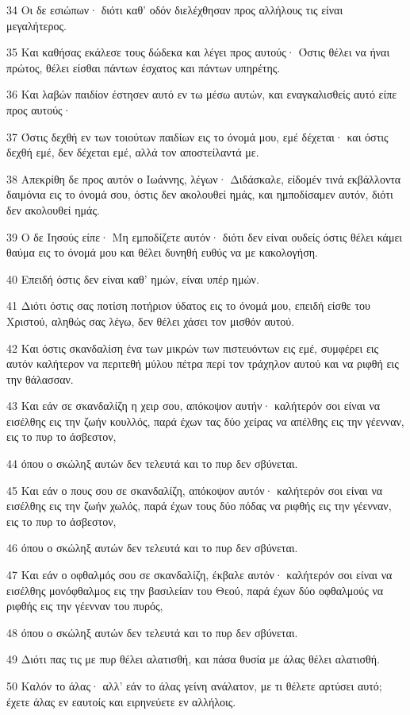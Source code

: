 \par 34 Οι δε εσιώπων· διότι καθ' οδόν διελέχθησαν προς αλλήλους τις είναι μεγαλήτερος.
\par 35 Και καθήσας εκάλεσε τους δώδεκα και λέγει προς αυτούς· Όστις θέλει να ήναι πρώτος, θέλει είσθαι πάντων έσχατος και πάντων υπηρέτης.
\par 36 Και λαβών παιδίον έστησεν αυτό εν τω μέσω αυτών, και εναγκαλισθείς αυτό είπε προς αυτούς·
\par 37 Όστις δεχθή εν των τοιούτων παιδίων εις το όνομά μου, εμέ δέχεται· και όστις δεχθή εμέ, δεν δέχεται εμέ, αλλά τον αποστείλαντά με.
\par 38 Απεκρίθη δε προς αυτόν ο Ιωάννης, λέγων· Διδάσκαλε, είδομέν τινά εκβάλλοντα δαιμόνια εις το όνομά σου, όστις δεν ακολουθεί ημάς, και ημποδίσαμεν αυτόν, διότι δεν ακολουθεί ημάς.
\par 39 Ο δε Ιησούς είπε· Μη εμποδίζετε αυτόν· διότι δεν είναι ουδείς όστις θέλει κάμει θαύμα εις το όνομά μου και θέλει δυνηθή ευθύς να με κακολογήση.
\par 40 Επειδή όστις δεν είναι καθ' ημών, είναι υπέρ ημών.
\par 41 Διότι όστις σας ποτίση ποτήριον ύδατος εις το όνομά μου, επειδή είσθε του Χριστού, αληθώς σας λέγω, δεν θέλει χάσει τον μισθόν αυτού.
\par 42 Και όστις σκανδαλίση ένα των μικρών των πιστευόντων εις εμέ, συμφέρει εις αυτόν καλήτερον να περιτεθή μύλου πέτρα περί τον τράχηλον αυτού και να ριφθή εις την θάλασσαν.
\par 43 Και εάν σε σκανδαλίζη η χειρ σου, απόκοψον αυτήν· καλήτερόν σοι είναι να εισέλθης εις την ζωήν κουλλός, παρά έχων τας δύο χείρας να απέλθης εις την γέενναν, εις το πυρ το άσβεστον,
\par 44 όπου ο σκώληξ αυτών δεν τελευτά και το πυρ δεν σβύνεται.
\par 45 Και εάν ο πους σου σε σκανδαλίζη, απόκοψον αυτόν· καλήτερόν σοι είναι να εισέλθης εις την ζωήν χωλός, παρά έχων τους δύο πόδας να ριφθής εις την γέενναν, εις το πυρ το άσβεστον,
\par 46 όπου ο σκώληξ αυτών δεν τελευτά και το πυρ δεν σβύνεται.
\par 47 Και εάν ο οφθαλμός σου σε σκανδαλίζη, έκβαλε αυτόν· καλήτερόν σοι είναι να εισέλθης μονόφθαλμος εις την βασιλείαν του Θεού, παρά έχων δύο οφθαλμούς να ριφθής εις την γέενναν του πυρός,
\par 48 όπου ο σκώληξ αυτών δεν τελευτά και το πυρ δεν σβύνεται.
\par 49 Διότι πας τις με πυρ θέλει αλατισθή, και πάσα θυσία με άλας θέλει αλατισθή.
\par 50 Καλόν το άλας· αλλ' εάν το άλας γείνη ανάλατον, με τι θέλετε αρτύσει αυτό; έχετε άλας εν εαυτοίς και ειρηνεύετε εν αλλήλοις.

